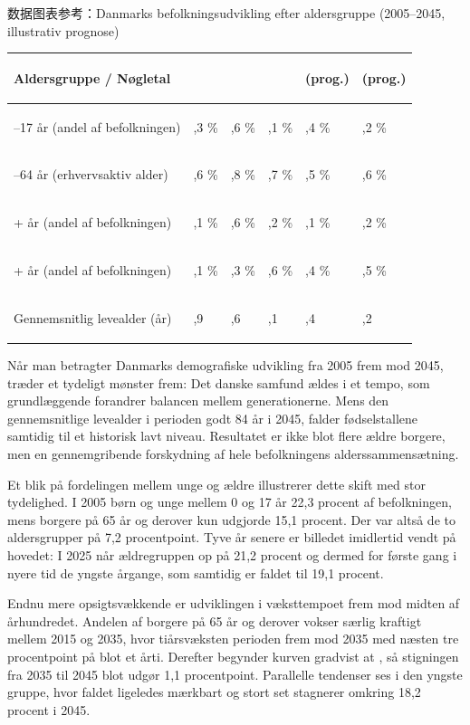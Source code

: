 \begin{tipbox}{数据图表参考：Danmarks befolkningsudvikling efter aldersgruppe (2005--2045, illustrativ prognose)}
\renewcommand{\arraystretch}{1.22}
{\small
\begin{tabularx}{\linewidth}{@{} >{\bfseries\raggedright\arraybackslash}p{4.8cm} >{\centering\arraybackslash}X >{\centering\arraybackslash}X >{\centering\arraybackslash}X >{\centering\arraybackslash}X >{\centering\arraybackslash}X @{}}
\toprule
Aldersgruppe / Nøgletal & 2005 & 2015 & 2025 & 2035 (prog.) & 2045 (prog.) \\
\midrule
0--17 år (andel af befolkningen) & 22,3 \% & 20,6 \% & 19,1 \% & 18,4 \% & 18,2 \% \\
18--64 år (erhvervsaktiv alder) & 62,6 \% & 60,8 \% & 59,7 \% & 57,5 \% & 56,6 \% \\
65+ år (andel af befolkningen) & 15,1 \% & 18,6 \% & 21,2 \% & 24,1 \% & 25,2 \% \\
80+ år (andel af befolkningen) & 4,1 \% & 4,3 \% & 5,6 \% & 7,4 \% & 8,5 \% \\
\midrule
Gennemsnitlig levealder (år) & 77,9 & 80,6 & 82,1 & 83,4 & 84,2 \\
\bottomrule
\end{tabularx}
}
\end{tipbox}

Når man betragter Danmarks demografiske udvikling fra 2005 frem mod 2045, træder et tydeligt mønster frem: Det danske samfund ældes i et tempo, som grundlæggende forandrer balancen mellem generationerne. Mens den gennemsnitlige levealder i perioden  godt 84 år i 2045, falder fødselstallene samtidig til et historisk lavt niveau. Resultatet er ikke blot flere ældre borgere, men en gennemgribende forskydning af hele befolkningens alderssammensætning.

Et blik på fordelingen mellem unge og ældre illustrerer dette skift med stor tydelighed. I 2005  børn og unge mellem 0 og 17 år  22,3 procent af befolkningen, mens borgere på 65 år og derover kun udgjorde 15,1 procent. Der var altså  de to aldersgrupper på 7,2 procentpoint. Tyve år senere er billedet imidlertid vendt på hovedet: I 2025 når ældregruppen op på 21,2 procent og  dermed for første gang i nyere tid de yngste årgange, som samtidig er faldet til 19,1 procent.

Endnu mere opsigtsvækkende er udviklingen i væksttempoet frem mod midten af århundredet. Andelen af borgere på 65 år og derover vokser særlig kraftigt mellem 2015 og 2035, hvor tiårsvæksten  perioden frem mod 2035 med næsten tre procentpoint på blot et årti. Derefter begynder kurven gradvist at , så stigningen fra 2035 til 2045 blot udgør 1,1 procentpoint. Parallelle tendenser ses i den yngste gruppe, hvor faldet ligeledes  mærkbart og stort set stagnerer omkring 18,2 procent i 2045.

